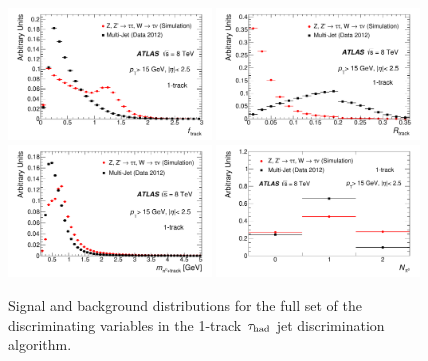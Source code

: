 \begin{figure}[tp]
  \includegraphics[width=0.48\textwidth]{figures/PERF-2013-06/figaux_03}
  \includegraphics[width=0.48\textwidth]{figures/PERF-2013-06/figaux_04}
  \includegraphics[width=0.48\textwidth]{figures/PERF-2013-06/figaux_05}
  \includegraphics[width=0.48\textwidth]{figures/PERF-2013-06/figaux_06}
  \caption{Signal and background distributions for the full set of the discriminating variables in the 1-track $\tau_\text{had}$ jet discrimination algorithm.}
  \label{fig:tauid-inputs-1p}
\end{figure}


